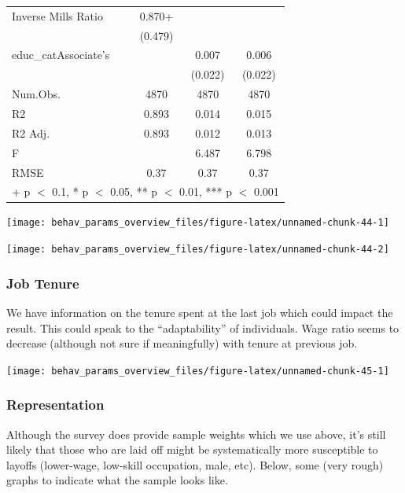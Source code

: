 \documentclass[
]{article}
\begin{document}
\begin{table}
{\begin{tabular}[t]{lccc}
Inverse Mills Ratio & \num{0.870}+ &  & \\
 & (\num{0.479}) &  & \\
educ\_catAssociate's &  & \num{0.007} & \num{0.006}\\
 &  & (\num{0.022}) & (\num{0.022})\\
\midrule
Num.Obs. & \num{4870} & \num{4870} & \num{4870}\\
R2 & \num{0.893} & \num{0.014} & \num{0.015}\\
R2 Adj. & \num{0.893} & \num{0.012} & \num{0.013}\\
F &  & \num{6.487} & \num{6.798}\\
RMSE & \num{0.37} & \num{0.37} & \num{0.37}\\
\bottomrule
\multicolumn{4}{l}{\rule{0pt}{1em}+ p $<$ 0.1, * p $<$ 0.05, ** p $<$ 0.01, *** p $<$ 0.001}\\
\end{tabular}}
\end{table}

\begin{center}\texttt{[image: behav\_params\_overview\_files/figure-latex/unnamed-chunk-44-1]} \end{center}

\begin{center}\texttt{[image: behav\_params\_overview\_files/figure-latex/unnamed-chunk-44-2]} \end{center}

\subsubsection{Job Tenure}\label{job-tenure}

We have information on the tenure spent at the last job which could
impact the result. This could speak to the ``adaptability'' of
individuals. Wage ratio seems to decrease (although not sure if
meaningfully) with tenure at previous job.

\begin{center}\texttt{[image: behav\_params\_overview\_files/figure-latex/unnamed-chunk-45-1]} \end{center}

\subsubsection{Representation}\label{representation}

Although the survey does provide sample weights which we use above, it's
still likely that those who are laid off might be systematically more
susceptible to layoffs (lower-wage, low-skill occupation, male, etc).
Below, some (very rough) graphs to indicate what the sample looks like.
\end{document}
